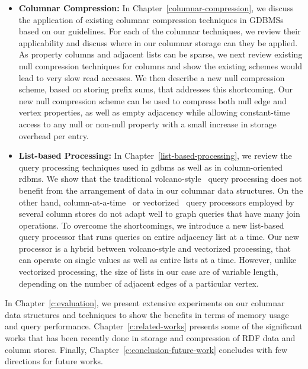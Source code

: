 \begin{itemize}
	\item \textbf{Columnar Compression:} In Chapter~\ref{columnar-compression}, we discuss the application of existing columnar compression techniques in GDBMSs based on our guidelines. For each of the columnar techniques, we review their applicability and discuss where in our columnar storage can they be applied. As property columns and adjacent lists can be sparse, we next review existing null compression techniques for columns and show the existing schemes would lead to very slow read accesses. We then describe a new null compression scheme, based on storing prefix sums, that addresses this shortcoming. Our new null compression scheme can be used to compress both null edge and vertex properties, as well as empty adjacency while allowing constant-time access to any null or non-null property with a small increase in storage overhead per entry. 
	
	\item \textbf{List-based Processing:} In Chapter~\ref{list-based-processing}, we review the query processing techniques used in \gls{gdbms} as well as in column-oriented \gls{rdbms}. We show that the traditional  volcano-style~\cite{volcano} query processing does not benefit from the arrangement of data in our columnar data structures. On the other hand, column-at-a-time~\cite{col-vs-row} or vectorized~\cite{boncz-vectorwise1} query processors employed by several column stores do not adapt well to graph queries that have many join operations. To overcome the shortcomings, we introduce a new list-based query processor that runs queries on entire adjacency list at a time. Our new processor is a hybrid between volcano-style and vectorized processing, that can operate on single values as well as entire lists at a time. However, unlike vectorized processing, the size of lists in our case are of variable length, depending on the number of adjacent edges of a particular vertex.
\end{itemize}

In Chapter~\ref{c:evaluation}, we present extensive experiments on our columnar data structures and techniques to show the benefits in terms of memory usage and query performance. Chapter~\ref{c:related-works} presents some of the significant works that has been recently done in storage and compression of RDF data and column stores. Finally, Chapter~\ref{c:conclusion-future-work} concludes with few directions for future works.


